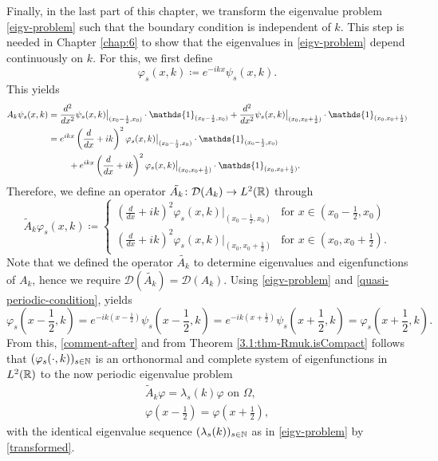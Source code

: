 Finally, in the last part of this chapter, we transform the eigenvalue problem \eqref{eigv-problem} such that the boundary condition is independent of $k$. This step is needed in Chapter \ref{chap:6} to show that the eigenvalues in \eqref{eigv-problem} depend continuously on $k$. For this, we first define
	\[ \varphi_{s}(x, k) \coloneqq e^{-ikx} \psi_{s}(x, k). \]
This yields
	\begin{align}
		A_{k} \psi_{s}(x, k) & = \frac{d^{2}}{dx^{2}} \psi_{s}(x, k)\big|_{(x_{0} - \frac{1}{2}, x_{0})} \cdot \mathds{1}_{(x_{0} - \frac{1}{2}, x_{0})} + \frac{d^{2}}{dx^{2}} \psi_{s}(x, k)\big|_{(x_{0}, x_{0}  + \frac{1}{2})} \cdot \mathds{1}_{(x_{0}, x_{0} + \frac{1}{2})} \notag \\
			& = e^{ikx} \left( \frac{d}{dx} + ik \right)^{2} \varphi_{s}(x, k)\big|_{(x_{0} - \frac{1}{2}, x_{0})} \cdot \mathds{1}_{(x_{0} - \frac{1}{2}, x_{0})} \notag \\
			& ~\qquad + e^{ikx} \left( \frac{d}{dx} + ik \right)^{2} \varphi_{s}(x, k)\big|_{(x_{0}, x_{0}  + \frac{1}{2})} \cdot \mathds{1}_{(x_{0}, x_{0} + \frac{1}{2})}. \label{transformed}
	\end{align}
Therefore, we define an operator $\tilde{A_{k}} \colon \mathcal{D}(A_{k}) \rightarrow L^{2}(\mathbb{R})$ through
	\[ \tilde{A}_{k} \varphi_{s}(x, k) \coloneqq \begin{cases}
		\left( \frac{d}{dx} + ik \right)^{2} \varphi_{s}(x, k)|_{(x_{0} - \frac{1}{2}, x_{0})} & \text{for } x \in (x_{0} - \frac{1}{2}, x_{0}) \\ \left( \frac{d}{dx} + ik \right)^{2} \varphi_{s}(x, k)|_{(x_{0}, x_{0}  + \frac{1}{2})} & \text{for } x \in (x_{0}, x_{0} + \frac{1}{2}).
	\end{cases} \] 
Note that we defined the operator $\tilde{A_{k}}$ to determine eigenvalues and eigenfunctions of $A_{k}$, hence we require $\mathcal{D}(\tilde{A_{k}}) = \mathcal{D}(A_{k})$. Using \eqref{eigv-problem} and \eqref{quasi-periodic-condition}, yields 
	\[ \varphi_{s}\left(x - \frac{1}{2}, k\right) = e^{-ik(x - \frac{1}{2})} \psi_{s}\left(x - \frac{1}{2}, k\right) = e^{-ik(x + \frac{1}{2})} \psi_{s}\left(x + \frac{1}{2}, k\right) = \varphi_{s}\left(x + \frac{1}{2}, k\right). \]
From this, \eqref{comment-after} and from Theorem \ref{3.1:thm-Rmuk.isCompact} follows that $(\varphi_{s}(\cdot, k))_{s \in \mathbb{N}}$ is an orthonormal and complete system of eigenfunctions in $L^{2}(\mathbb{R})$ to the now periodic eigenvalue problem
	\begin{align}
		\tilde{A}_{k} \varphi = \lambda_{s}(k) \varphi \text{ on } \Omega, \label{mod-eigv-problem} \\
		\varphi\left(x - \frac{1}{2}\right) = \varphi\left(x + \frac{1}{2}\right), \label{periodic-condition}
	\end{align}
with the identical eigenvalue sequence $(\lambda_{s}(k))_{s \in \mathbb{N}}$ as in \eqref{eigv-problem} by \eqref{transformed}.